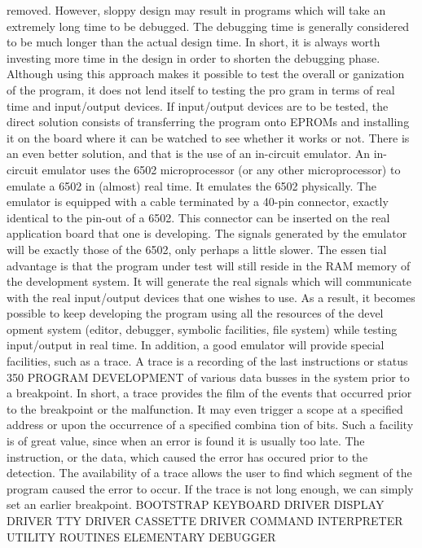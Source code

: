 {{{{{{{{{{{{{{{{{{{{{{{{{{{{{{{{{{{{{{{{{{{{{{{{{{{{{{{{{{{{{{{{{{{{{{{{{{{{{{{{{{{{{{{{{{{{{{{{{{{{{{{{{{{{{{{{{{{{{{{{{{{{{{{{{{{{{{{{{{{{removed. However, sloppy design may result in programs which
will take an extremely long time to be debugged. The debugging
time is generally considered to be much longer than the actual
design time. In short, it is always worth investing more time in
the design in order to shorten the debugging phase.
Although using this approach makes it possible to test the overall or
ganization of the program, it does not lend itself to testing the pro
gram in terms of real time and input/output devices. If input/output
devices are to be tested, the direct solution consists of transferring the
program onto EPROMs and installing it on the board where it can
be watched to see whether it works or not.
There is an even better solution, and that is the use of an in-circuit
emulator. An in-circuit emulator uses the 6502 microprocessor (or
any other microprocessor) to emulate a 6502 in (almost) real time. It
emulates the 6502 physically. The emulator is equipped with a cable
terminated by a 40-pin connector, exactly identical to the pin-out of a
6502. This connector can be inserted on the real application board that one
is developing. The signals generated by the emulator will be
exactly those of the 6502, only perhaps a little slower. The essen
tial advantage is that the program under test will still reside in
the RAM memory of the development system. It will generate the
real signals which will communicate with the real input/output
devices that one wishes to use. As a result, it becomes possible to
keep developing the program using all the resources of the devel
opment system (editor, debugger, symbolic facilities, file system)
while testing input/output in real time.
In addition, a good emulator will provide special facilities, such
as a trace. A trace is a recording of the last instructions or status
350
PROGRAM DEVELOPMENT
of various data busses in the system prior to a breakpoint. In
short, a trace provides the film of the events that occurred prior to
the breakpoint or the malfunction. It may even trigger a scope at
a specified address or upon the occurrence of a specified combina
tion of bits. Such a facility is of great value, since when an error is
found it is usually too late. The instruction, or the data, which
caused the error has occured prior to the detection. The availability
of a trace allows the user to find which segment of the program
caused the error to occur. If the trace is not long enough, we can
simply set an earlier breakpoint.
BOOTSTRAP
KEYBOARD
DRIVER
DISPLAY
DRIVER
TTY
DRIVER
CASSETTE
DRIVER
COMMAND
INTERPRETER
UTILITY
ROUTINES
ELEMENTARY
DEBUGGER
}}}}}}}}}}}}}}}}}}}}}}}}}}}}}}}}}}}}}}}}}}}}}}}}}}}}}}}}}}}}}}}}}}}}}}}}}}}}}}}}}}}}}}}}}}}}}}}}}}}}}}}}}}}}}}}}}}}}}}}}}}}}}}}}}}}}}}}}}}}}
